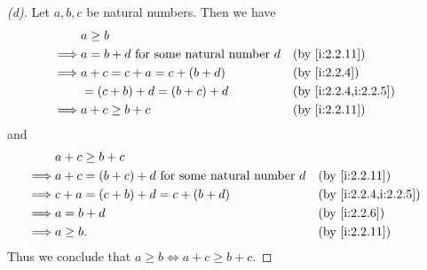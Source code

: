 \begin{proof}[(d)]
  Let \(a, b, c\) be natural numbers.
  Then we have
  \begin{align*}
             & a \geq b                                                               \\
    \implies & a = b + d \text{ for some natural number } d &  & \by{i:2.2.11}        \\
    \implies & a + c = c + a = c + (b + d)                  &  & \by{i:2.2.4}         \\
             & = (c + b) + d = (b + c) + d                  &  & \by{i:2.2.4,i:2.2.5} \\
    \implies & a + c \geq b + c                             &  & \by{i:2.2.11}
  \end{align*}
  and
  \begin{align*}
             & a + c \geq b + c                                                                 \\
    \implies & a + c = (b + c) + d \text{ for some natural number } d &  & \by{i:2.2.11}        \\
    \implies & c + a = (c + b) + d = c + (b + d)                      &  & \by{i:2.2.4,i:2.2.5} \\
    \implies & a = b + d                                              &  & \by{i:2.2.6}         \\
    \implies & a \geq b.                                              &  & \by{i:2.2.11}
  \end{align*}
  Thus we conclude that \(a \geq b \iff a + c \geq b + c\).
\end{proof}

